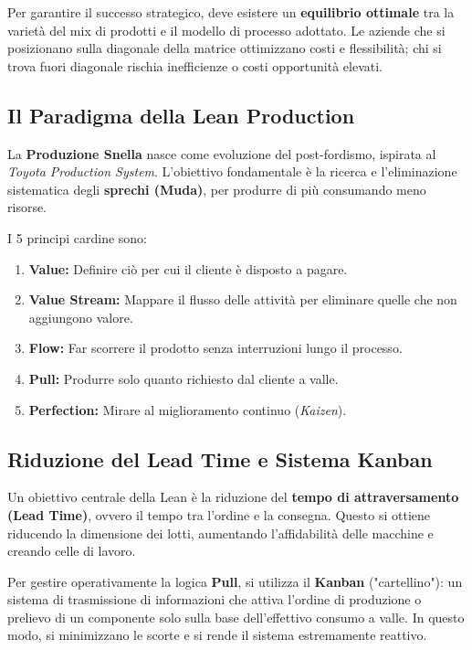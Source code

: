 \documentclass[a4paper,10pt]{article}
\begin{document}
Per garantire il successo strategico, deve esistere un \textbf{equilibrio ottimale} tra la varietà del mix di prodotti e il modello di processo adottato. Le aziende che si posizionano sulla diagonale della matrice ottimizzano costi e flessibilità; chi si trova fuori diagonale rischia inefficienze o costi opportunità elevati.

\subsection*{Il Paradigma della Lean Production}

La \textbf{Produzione Snella} nasce come evoluzione del post-fordismo, ispirata al \textit{Toyota Production System}. L'obiettivo fondamentale è la ricerca e l'eliminazione sistematica degli \textbf{sprechi (Muda)}, per produrre di più consumando meno risorse.

I 5 principi cardine sono:
\begin{enumerate}
    \item \textbf{Value:} Definire ciò per cui il cliente è disposto a pagare.
    \item \textbf{Value Stream:} Mappare il flusso delle attività per eliminare quelle che non aggiungono valore.
    \item \textbf{Flow:} Far scorrere il prodotto senza interruzioni lungo il processo.
    \item \textbf{Pull:} Produrre solo quanto richiesto dal cliente a valle.
    \item \textbf{Perfection:} Mirare al miglioramento continuo (\textit{Kaizen}).
\end{enumerate}

\subsection*{Riduzione del Lead Time e Sistema Kanban}

Un obiettivo centrale della Lean è la riduzione del \textbf{tempo di attraversamento (Lead Time)}, ovvero il tempo tra l'ordine e la consegna. Questo si ottiene riducendo la dimensione dei lotti, aumentando l'affidabilità delle macchine e creando celle di lavoro.

Per gestire operativamente la logica \textbf{Pull}, si utilizza il \textbf{Kanban} ("cartellino"): un sistema di trasmissione di informazioni che attiva l'ordine di produzione o prelievo di un componente solo sulla base dell'effettivo consumo a valle. In questo modo, si minimizzano le scorte e si rende il sistema estremamente reattivo.
\end{document}
